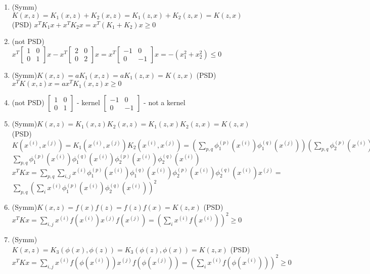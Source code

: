 \begin{answer}
\begin{enumerate}

\item
\subitem  (Symm)$K(x,z) = K_1(x,z) + K_2(x,z) = K_1(z,x) + K_2(z,x) = K(z,x)$
\subitem (PSD) $x^TK_1x + x^TK_2x = x^T(K_1 + K_2)x \ge 0$ 
\item (not PSD) $
x^T
\begin{bmatrix}
    1  & 0 \\
    0  & 1
\end{bmatrix} x - 
x^T
\begin{bmatrix}
    2  & 0 \\
    0  & 2
\end{bmatrix} x =
x^T
\begin{bmatrix}
    -1  & 0 \\
    0  & -1
\end{bmatrix} x =
- (x_1^2 + x_2^2) \le 0
$
\item 
\subitem  (Symm)$K(x,z) = a K_1(x,z) = a K_1(z,x) = K(z,x)$
\subitem (PSD) $x^TK(x,z)x = a x^TK_1(x,z)x \ge 0$
\item (not PSD) 
$
\begin{bmatrix}
    1  & 0 \\
    0  & 1
\end{bmatrix} 
$ - kernel
$
\begin{bmatrix}
    -1  & 0 \\
    0  & -1
\end{bmatrix} 
$ - not a kernel
\item
\subitem  (Symm)$K(x,z) = K_1(x,z)K_2(x,z) =  K_1(z,x)K_2(z,x)= K(z,x)$
\subitem (PSD) $K(x^{(i)}, x^{(j)}) =K_1(x^{(i)}, x^{(j)})K_2(x^{(i)}, x^{(j)}) = (\sum_{p, q} \phi_1^{(p)}(x^{(i)}) \phi_1^{(q)}(x^{(j)}))  (\sum_{p, q} \phi_2^{(p)}(x^{(i)}) \phi_2^{(q)}(x^{(j)})) =$
$\sum_{p, q} \phi_1^{(p)}(x^{(i)}) \phi_1^{(q)}(x^{(i)}) \phi_2^{(p)}(x^{(i)}) \phi_2^{(q)}(x^{(i)})$ 
$x^TKx = \sum_{p, q}  \sum_{i, j} x^{(i)} \phi_1^{(p)}(x^{(i)}) \phi_1^{(q)}(x^{(i)}) \phi_2^{(p)}(x^{(i)}) \phi_2^{(q)}(x^{(i)}) x^{(j)} =$
$\sum_{p, q} (\sum_{i} x^{(i)} \phi_1^{(p)}(x^{(i)}) \phi_2^{(q)}(x^{(i)}))^2$
\item 
\subitem  (Symm)$K(x,z) = f(x) f(z) = f(z) f(x) = K(z,x)$
\subitem (PSD) $x^TKx = \sum_{i, j} x^{(i)} f(x^{(i)}) x^{(j)} f(x^{(j)}) = (\sum_{i}x^{(i)} f(x^{(i)}) )^2 \ge 0$
\item
\subitem  (Symm) $K(x,z) = K_3(\phi(x), \phi(z)) = K_3(\phi(z), \phi(x)) = K(z,x)$
\subitem (PSD) $x^TKx = \sum_{i, j} x^{(i)} f(\phi(x^{(i)})) x^{(j)} f(\phi(x^{(j)})) = (\sum_{i}x^{(i)} f(\phi(x^{(i)})) )^2 \ge 0$

\end{enumerate}
\end{answer}
